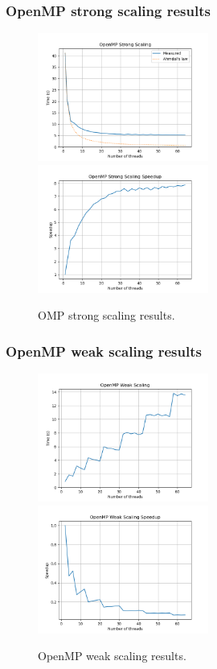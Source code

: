 \documentclass{beamer}
\begin{document}
\begin{frame}
    \frametitle{OpenMP \textbf{strong} scaling results}
    \begin{figure}
        \centering
        \includegraphics[width=0.5\textwidth]{../images/omp_strong_scaling.png}
        \includegraphics[width=0.5\textwidth]{../images/omp_strong_scaling_speedup.png}
        \caption{OMP strong scaling results.}
    \end{figure}
\end{frame}

\begin{frame}
    \frametitle{OpenMP \textbf{weak} scaling results}
    \begin{figure}
        \centering
        \includegraphics[width=0.5\textwidth]{../images/omp_weak_scaling.png}
        \includegraphics[width=0.5\textwidth]{../images/omp_weak_scaling_speedup.png}
        \caption{OpenMP weak scaling results.}
    \end{figure}
\end{frame}
\end{document}
